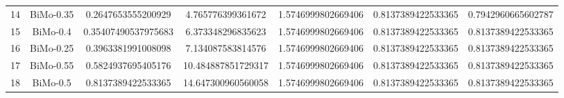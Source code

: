 \documentclass[a4paper,10pt]{article}
\begin{document}
\begin{landscape}
\begin{table}[!htp]
\begin{tabular}{ccccccc}
14&BiMo-0.35&0.2647653555200929&4.765776399361672&1.5746999802669406&0.8137389422533365&0.7942960665602787\\
15&BiMo-0.4&0.35407490537975683&6.373348296835623&1.5746999802669406&0.8137389422533365&0.8137389422533365\\
16&BiMo-0.25&0.3963381991008098&7.134087583814576&1.5746999802669406&0.8137389422533365&0.8137389422533365\\
17&BiMo-0.55&0.5824937695405176&10.484887851729317&1.5746999802669406&0.8137389422533365&0.8137389422533365\\
18&BiMo-0.5&0.8137389422533365&14.647300960560058&1.5746999802669406&0.8137389422533365&0.8137389422533365\\
\hline
\end{tabular}
\end{table}


\end{landscape}
\end{document}

